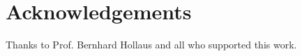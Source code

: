 \section*{Acknowledgements}\thispagestyle{plain}\label{acknowledgements}
Thanks to Prof. Bernhard Hollaus and all who supported this work. %
\clearpage
